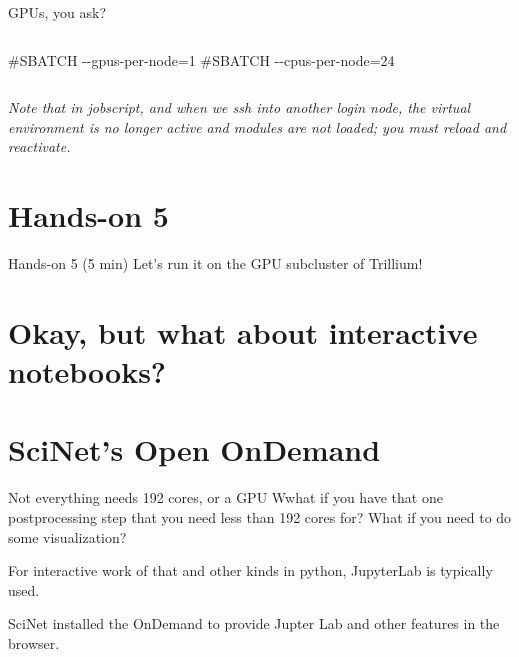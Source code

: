 \documentclass[
  10pt,
  ignorenonframetext,
  aspectratio=169,handout]{beamer}
\newenvironment{Shaded}{\begin{snugshade}}{\end{snugshade}}
\newcommand{\CommentTok}[1]{\textcolor[rgb]{0.50,0.62,0.50}{#1}}
\begin{document}
\begin{frame}[fragile]{GPUs, you ask?}
\begin{columns}[T]
\begin{column}{0.47\linewidth}
\begin{Shaded}
\begin{Highlighting}[]
\CommentTok{\#SBATCH {-}{-}gpus{-}per{-}node=1}
\CommentTok{\#SBATCH {-}{-}cpus{-}per{-}node=24}
\end{Highlighting}
\end{Shaded}
\end{column}
\end{columns}

\pause

\emph{Note that in jobscript, and when we ssh into another login node, the virtual environment is no longer active and modules are not loaded; you must reload and reactivate.}
\end{frame}

\section{Hands-on 5}\label{hands-on-5}

\begin{frame}{Hands-on 5 (5 min)}
\label{hands-on-5-5-min}
Let's run it on the GPU subcluster of Trillium!
\end{frame}

\section{Okay, but what about interactive notebooks?}\label{okay-but-what-about-interactive-notebooks}

\section{SciNet's Open OnDemand}\label{scinets-open-ondemand}

\begin{frame}{Not everything needs 192 cores, or a GPU}
\label{not-everything-needs-192-cores-or-a-gpu}
Wwhat if you have that one postprocessing step that you need less than 192 cores for? \vspace{\baselineskip} What if you need to do some visualization? \vspace{\baselineskip}

\pause

For interactive work of that and other kinds in python, JupyterLab is typically used.

\pause

SciNet installed the OnDemand to provide Jupter Lab and other features in the browser.
\end{frame}
\end{document}
